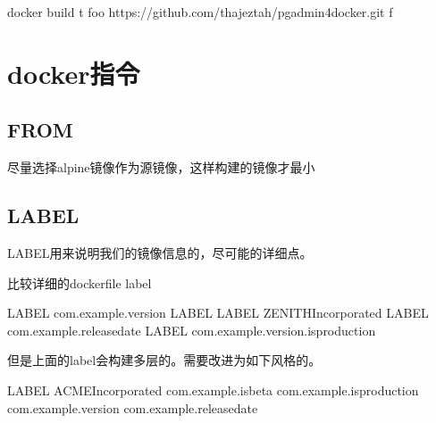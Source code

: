 \documentclass[letterpaper,10pt,english]{sphinxmanual}
\begin{document}
%
\begin{sphinxVerbatim}[commandchars=\\\{\}]
docker build \PYGZhy{}t foo https://github.com/thajeztah/pgadmin4\PYGZhy{}docker.git \PYGZhy{}f\PYGZhy{}
\end{sphinxVerbatim}


\section{docker指令}
\label{\detokenize{_u8fd0_u884c_u5e94_u7528/02-dockerfile_u7f16_u5199_u6700_u4f73_u5b9e_u8df5:docker}}

\subsection{FROM}
\label{\detokenize{_u8fd0_u884c_u5e94_u7528/02-dockerfile_u7f16_u5199_u6700_u4f73_u5b9e_u8df5:from}}
尽量选择alpine镜像作为源镜像，这样构建的镜像才最小


\subsection{LABEL}
\label{\detokenize{_u8fd0_u884c_u5e94_u7528/02-dockerfile_u7f16_u5199_u6700_u4f73_u5b9e_u8df5:label}}
LABEL用来说明我们的镜像信息的，尽可能的详细点。

比较详细的dockerfile label

%
\begin{sphinxVerbatim}[commandchars=\\\{\}]
LABEL com.example.version
LABEL 
LABEL ZENITHIncorporated
LABEL com.example.release\PYGZhy{}date
LABEL com.example.version.is\PYGZhy{}production
\end{sphinxVerbatim}

但是上面的label会构建多层的。需要改进为如下风格的。

%
\begin{sphinxVerbatim}[commandchars=\\\{\}]
LABEL ACMEIncorporated 
    com.example.is\PYGZhy{}beta 
    com.example.is\PYGZhy{}production 
    com.example.version 
    com.example.release\PYGZhy{}date
\end{sphinxVerbatim}
\end{document}
